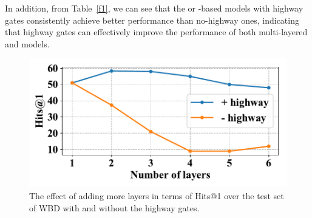 In addition, from Table~\ref{f1}, we can see that the \GCN or \RGCN-based models with highway gates consistently achieve better performance than no-highway ones, indicating that highway gates can effectively improve the performance of both multi-layered \GCN and \RGCN models.
\begin{figure}
	\centering
	\includegraphics[width=1\linewidth]{figures/graph3.pdf}
	\caption{The effect of adding more \RGCN layers in terms of Hits@1 over the test set of WBD with and without the highway gates.}
	\label{highway}
\end{figure}
